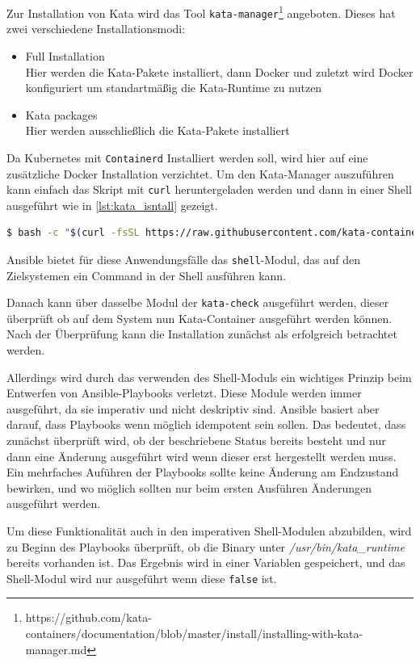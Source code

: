 Zur Installation von Kata wird das Tool \texttt{kata-manager}\footnote{https://github.com/kata-containers/documentation/blob/master/install/installing-with-kata-manager.md} angeboten. 
Dieses hat zwei verschiedene Installationsmodi:
\begin{itemize}
    \item Full Installation \\ Hier werden die Kata-Pakete installiert, dann Docker und zuletzt wird Docker konfiguriert um standartmäßig die Kata-Runtime zu nutzen
    \item Kata packages \\ Hier werden ausschließlich die Kata-Pakete installiert
\end{itemize}
Da Kubernetes mit \texttt{Containerd} Installiert werden soll, wird hier auf eine zusätzliche Docker Installation verzichtet.
Um den Kata-Manager auszuführen kann einfach das Skript mit \texttt{curl} heruntergeladen werden und dann in einer Shell ausgeführt wie in \ref{lst:kata_isntall} gezeigt.
\newpage
\begin{lstlisting}[language=bash, caption={Kata Installation}, label={lst:kata_isntall}]
$ bash -c "$(curl -fsSL https://raw.githubusercontent.com/kata-containers/tests/master/cmd/kata-manager/kata-manager.sh) install-packages"
\end{lstlisting}
Ansible bietet für diese Anwendungsfälle das \texttt{shell}-Modul, das auf den Zielsystemen ein Command in der Shell ausführen kann. 

Danach kann über dasselbe Modul der \texttt{kata-check} ausgeführt werden, dieser überprüft ob auf dem System nun Kata-Container ausgeführt werden können.
Nach der Überprüfung kann die Installation zunächst als erfolgreich betrachtet werden.

Allerdings wird durch das verwenden des Shell-Moduls ein wichtiges Prinzip beim Entwerfen von Ansible-Playbooks verletzt. 
Diese Module werden immer ausgeführt, da sie imperativ und nicht deskriptiv sind. 
Ansible basiert aber darauf, dass Playbooks wenn möglich idempotent sein sollen.
Das bedeutet, dass zunächst überprüft wird, ob der beschriebene Status bereits besteht und nur dann eine Änderung ausgeführt wird wenn dieser erst hergestellt werden muss. \cite{ansibel_idempotency}
Ein mehrfaches Auführen der Playbooks sollte keine Änderung am Endzustand bewirken, und wo möglich sollten nur beim ersten Ausführen Änderungen ausgeführt werden. 

Um diese Funktionalität auch in den imperativen Shell-Modulen abzubilden, wird zu Beginn des Playbooks überprüft, ob die Binary unter \textit{/usr/bin/kata\_runtime} bereits vorhanden ist. 
Das Ergebnis wird in einer Variablen gespeichert, und das Shell-Modul wird nur ausgeführt wenn diese \texttt{false} ist. 

